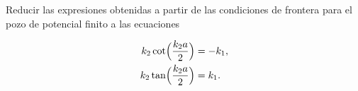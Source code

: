\documentclass[../main.tex]{subfiles}
\begin{document}
\begin{problema}
	Reducir las expresiones obtenidas a partir de las condiciones de frontera para el pozo de potencial finito a las ecuaciones

	\begin{align*}
		k_{2} \cot \Bigl(\dfrac{k_{2}a}{2}\Bigr) & = -k_{1}, \\
		k_{2}\tan \Bigl(\dfrac{k_{2}a}{2}\Bigr)  & = k_{1}.
	\end{align*}
\end{problema}
\end{document}
